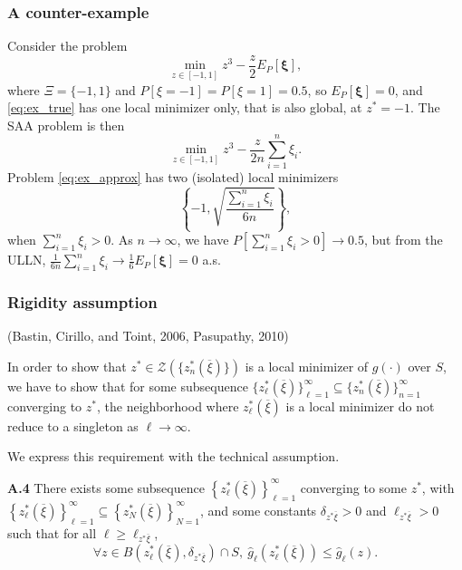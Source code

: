 \documentclass{beamer}
\def\bxi{\boldsymbol\xi}
\begin{document}
\begin{frame}
\frametitle{A counter-example}

Consider the problem
\begin{equation}\label{eq:ex_true}
\min_{z \in [-1, 1]} z^3 - \frac{z}{2}E_P[\bxi],
\end{equation}
where $\Xi = \lbrace -1, 1\rbrace$ and $P[\xi = -1] = P[\xi = 1] = 0.5$, so $E_P[\bxi] = 0$, and \eqref{eq:ex_true} has one local minimizer only, that is also global, at $z^* = -1$.
The SAA problem is then
\begin{equation}\label{eq:ex_approx}
\min_{z \in [-1, 1]} z^3 - \frac{z}{2n}\sum_{i = 1}^n \xi_i.
\end{equation}
Problem \eqref{eq:ex_approx} has two (isolated) local minimizers
\[
\left\lbrace -1, \sqrt{\frac{\sum_{i=1}^n \xi_i}{6n}}\right\rbrace,
\]
when $\sum_{i=1}^n \xi_i > 0$.
As $n \rightarrow \infty$, we have $P\left[\sum_{i=1}^n \xi_i > 0\right] \rightarrow 0.5$, but from the ULLN, $\frac{1}{6n}\sum_{i=1}^n \xi_i \rightarrow \frac{1}{6}E_P[\bxi] = 0$ a.s.

\end{frame}

\begin{frame}
\frametitle{Rigidity assumption}

(Bastin, Cirillo, and Toint, 2006, Pasupathy, 2010)


In order to show that $z^* \in \mathcal{Z}\left(\lbrace z^*_n(\overline{\xi})\rbrace\right)$ is a local minimizer of $g(\cdot)$ over $S$, 
we have to show that for some subsequence $\lbrace z^*_{\ell} (\overline{\xi}) \rbrace_{\ell = 1}^{\infty} \subseteq \lbrace z^*_{n} (\overline{\xi}) \rbrace_{n = 1}^{\infty}$ converging to $z^*$, the neighborhood where $z_{\ell}^*(\overline{\xi})$ is a local minimizer do not reduce to a singleton as $\ell \rightarrow \infty$.

\mbox{}

We express this requirement with the technical assumption.

\noindent
\textbf{A.4}
There exists some subsequence $\left\lbrace z^*_{\ell} (\overline{\xi}) \right\rbrace_{\ell = 1}^{\infty}$ converging to some $z^*$, with $\left\lbrace z^*_{\ell} (\overline{\xi}) \right\rbrace_{\ell = 1}^{\infty} \subseteq \left\lbrace z^*_{N} (\overline{\xi}) \right\rbrace_{N = 1}^{\infty}$, and some constants $\delta_{z^*\overline{\xi}} >0$ and $\ell_{z^* \overline{\xi}} > 0$ such that for all $\ell \geq \ell_{ z^* \overline{\xi}}$,
\[
\forall z \in B\left( z_{\ell}^*(\overline{\xi}), \delta_{z^*
  \overline{\xi}} \right) \cap S, \  \hat{g}_{\ell} \left(
  z_{\ell}^*(\overline{\xi}) \right) \leq \hat{g}_{\ell}(z).
\]


\end{frame}
\end{document}
